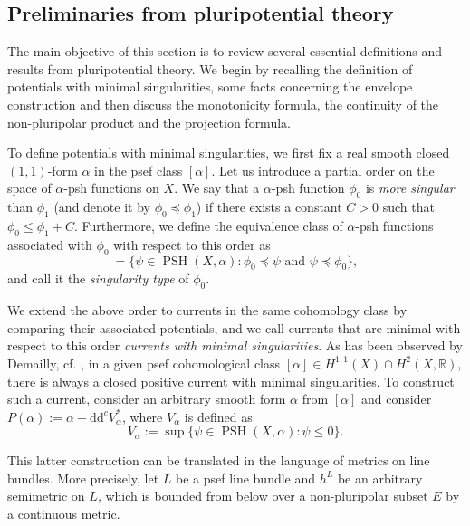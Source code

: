 \documentclass[12pt]{article}
\numberwithin{equation}{section}
\theoremstyle{theorem}
\theoremstyle{definition}
\theoremstyle{remark}
\newcommand{\real}{\mathbb{R}}
\newcommand{\ddc}{\mathrm{d} \mathrm{d}^c}
\newcommand{\psh}{\operatorname{PSH}}
\begin{document}
	\subsection{Preliminaries from pluripotential theory}\label{sect_min_sing}
	The main objective of this section is to review several essential definitions and results from pluripotential theory. 
	We begin by recalling the definition of potentials with minimal singularities, some facts concerning the envelope construction and then discuss the monotonicity formula, the continuity of the non-pluripolar product and the projection formula.
	\par 
	To define potentials with minimal singularities, we first fix a real smooth closed $(1, 1)$-form $\alpha$ in the psef class $[\alpha]$.
	Let us introduce a partial order on the space of $\alpha$-psh functions on $X$. 
	We say that a $\alpha$-psh function $\phi_0$ is \emph{more singular} than $\phi_1$ (and denote it by $\phi_0 \preceq \phi_1$) if there exists a constant $C > 0$ such that $\phi_0 \leq \phi_1 + C$.  
	Furthermore, we define the equivalence class of $\alpha$-psh functions associated with $\phi_0$ with respect to this order as 
	\begin{equation}
		[\phi_0] = \Big\{ \psi \in \psh(X, \alpha) : \phi_0 \preceq \psi \text{ and } \psi \preceq \phi_0 \Big\},
	\end{equation}
	and call it the \textit{singularity type} of $\phi_0$.
	\par 
	We extend the above order to currents in the same cohomology class by comparing their associated potentials, and we call currents that are minimal with respect to this order \textit{currents with minimal singularities}.
	As has been observed by Demailly, cf. \cite{DPSPseudoeff}, in a given psef cohomological class $[\alpha] \in H^{1, 1}(X) \cap H^2(X, \real)$, there is always a closed positive current with minimal singularities.
	To construct such a current, consider an arbitrary smooth form $\alpha$ from $[\alpha]$ and consider $P(\alpha) := \alpha + \ddc V_{\alpha}^*$, where $V_{\alpha}$ is defined as
	\begin{equation}\label{eq_v_theta}
		V_{\alpha} := \sup \big\{ \psi \in \psh(X, \alpha) : \psi \leq 0 \big\}.
	\end{equation}	 
	\par
	This latter construction can be translated in the language of metrics on line bundles.
	More precisely, let $L$ be a psef line bundle and $h^L$ be an arbitrary semimetric on $L$, which is bounded from below over a non-pluripolar subset $E$ by a continuous metric.
\end{document}
